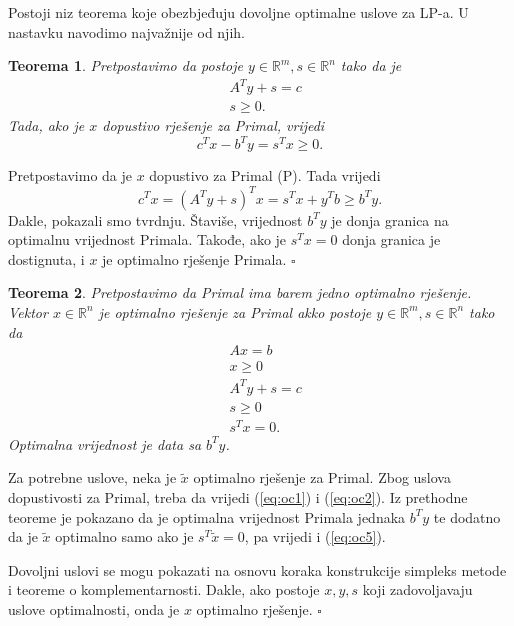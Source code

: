 \documentclass[a4paper, utf8, 11pt, colorlinks]{book}
\newtheorem{thm}{Teorema}
\newenvironment{proof}{{Dokaz:}}{\hfill$\square$}
\begin{document}
Postoji niz teorema koje obezbjeđuju dovoljne optimalne uslove za LP-a. U nastavku navodimo najvažnije od njih. 
\begin{thm}
	 Pretpostavimo da postoje $y \in \mathbb{R}^m, s \in \mathbb{R}^n$ tako da je 
	 \begin{align*}
	 	    &A^Ty + s = c \\
	 	    & s \geq 0.
	 \end{align*}
 Tada, ako je $x$ dopustivo rješenje za Primal, vrijedi 
 $$ c^T x - b^T y = s^T x \geq 0 .$$
\end{thm}
\begin{proof}
	 Pretpostavimo da je $x$ dopustivo za Primal (P). Tada vrijedi
	 $$ c^Tx = (A^Ty + s)^Tx = s^Tx + y^Tb \geq b^T y.$$
	 Dakle, pokazali smo tvrdnju. Štaviše, vrijednost $b^Ty$ je donja granica na optimalnu vrijednost Primala. Takođe, ako je $s^T x = 0$ donja granica je dostignuta, i $x$ je optimalno rješenje Primala.
\end{proof}
\begin{thm}
	Pretpostavimo da Primal ima barem jedno optimalno rješenje. Vektor $x \in \mathbb{R}^n$ je optimalno rješenje za Primal akko postoje $y \in \mathbb{R}^m, s\in \mathbb{R}^n$ tako da 
	\begin{align}
		  &A x= b \label{eq:oc1}\\
		  & x \geq 0 \label{eq:oc2}\\
		  & A^T y + s =c \label{eq:oc3}\\
		  & s \geq 0 \label{eq:oc4}\\
		  & s^T x = 0. \label{eq:oc5} 
	\end{align}
Optimalna vrijednost je data sa $b^T y$.
\end{thm}
\begin{proof}
 Za potrebne uslove, neka je $\tilde{x}$ optimalno rješenje za Primal. Zbog uslova dopustivosti za Primal, treba da vrijedi (\ref{eq:oc1}) i (\ref{eq:oc2}). Iz prethodne teoreme je pokazano da je optimalna vrijednost Primala  jednaka $b^Ty$ te dodatno da je $\tilde{x}$ optimalno samo ako je $s^T \tilde{x}=0$, pa vrijedi i (\ref{eq:oc5}).
 
 	Dovoljni uslovi se mogu pokazati na osnovu koraka konstrukcije simpleks metode  i teoreme o komplementarnosti. Dakle, ako postoje $x, y, s$ koji zadovoljavaju uslove optimalnosti, onda je $x$ optimalno rješenje.
\end{proof}
\end{document}
